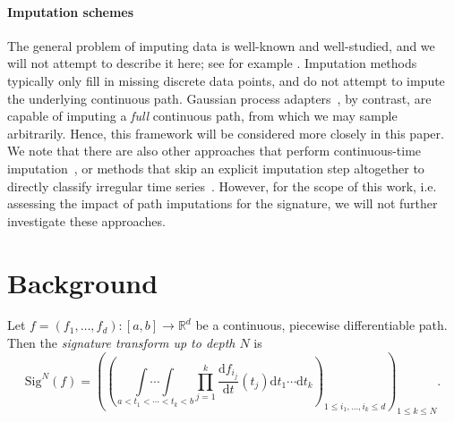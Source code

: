 \documentclass{article}
\newcommand{\reals}{\mathbb{R}}
\newcommand{\sig}{\mathrm{Sig}^N}
\begin{document}
\paragraph{Imputation schemes} The general problem of imputing data is well-known and well-studied, and
we will not attempt to describe it here; see for example \citet[Chapter 25]{gelman2007dataanalysis}.
Imputation methods typically only fill in missing discrete data
points, and do not attempt to impute the underlying continuous path.
Gaussian process adapters~\citep{li2016scalable}, by contrast, are
capable of imputing a \emph{full} continuous path, from which we
may sample arbitrarily. Hence, this framework will be
considered more closely in this paper.
We note that there are also other approaches that
perform continuous-time imputation~\citep{shukla2018interpolationprediction},
or methods that skip an explicit imputation step altogether to directly classify irregular time series~\citep{che2018recurrent, rubanova2019latent, kidger2020neuralcde}. However, for the scope of this work, i.e. assessing the impact of path imputations for the signature, we will not further investigate these approaches.

\section{Background} %

Let $f = (f_1, \dots, f_d) \colon [a, b] \to \reals^d$ be a continuous, piecewise
differentiable path. Then the \emph{signature transform up to depth $N$}
is
\begin{equation}\label{eq:signature}
    \sig(f)=\left(\left(\underset{\,a<t_{1}<\cdots<t_{k}<b}{\int \cdots \int} \prod_{j=1}^{k} \frac{\mathrm{d} f_{i_{j}}}{\mathrm{d} t}\left(t_{j}\right) \mathrm{d} t_{1} \cdots \mathrm{d} t_{k}\right)_{1 \leq i_{1}, \ldots, i_{k} \leq d}\right)_{1 \leq k \leq N}.
\end{equation}
\end{document}

